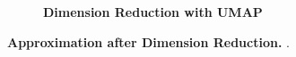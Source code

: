\begin{figure}
\begin{adjustbox}{minipage=\dimexpr{}\fboxrule,fbox}
\begin{subfigure}[b]{0.475\textwidth}
            \caption[Dimension Reduction with UMAP]{\textbf{Dimension Reduction with UMAP}}
            \label{fig:2.4.2b}
        \end{subfigure}
    \end{adjustbox}
    \caption[Approximation after Dimension Reduction]{\textbf{Approximation after Dimension Reduction.} .}
    \label{fig:2.4.2}
\end{figure}